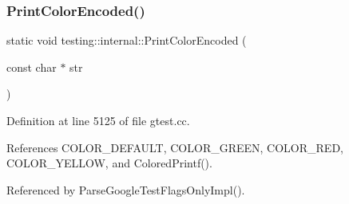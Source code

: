 \mbox{\label{namespacetesting_1_1internal_a7d8c446a29c7e22d7d4dde8f530bb57e}} 
\subsubsection{\texorpdfstring{Print\+Color\+Encoded()}{PrintColorEncoded()}}
{\footnotesize\ttfamily static void testing\+::internal\+::\+Print\+Color\+Encoded (\begin{DoxyParamCaption}\item[{const char $\ast$}]{str }\end{DoxyParamCaption})\hspace{0.3cm}{\ttfamily [static]}}



Definition at line 5125 of file gtest.\+cc.



References C\+O\+L\+O\+R\+\_\+\+D\+E\+F\+A\+U\+LT, C\+O\+L\+O\+R\+\_\+\+G\+R\+E\+EN, C\+O\+L\+O\+R\+\_\+\+R\+ED, C\+O\+L\+O\+R\+\_\+\+Y\+E\+L\+L\+OW, and Colored\+Printf().



Referenced by Parse\+Google\+Test\+Flags\+Only\+Impl().


